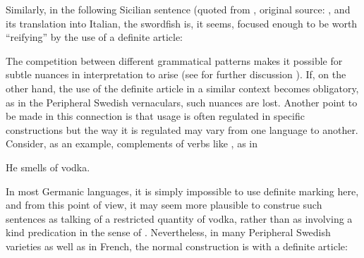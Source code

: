 Similarly, in the following Sicilian sentence (quoted from \citet[413]{BertinettoEtAl2000}, original source: \citet[231]{Skubic1973-74}, and its translation into Italian, the swordfish is, it seems, focused enough to be worth “reifying” by the use of a definite article:

\ea 
	\z	 
\z

The competition between different grammatical patterns makes it possible for subtle nuances in interpretation to arise (see for further discussion \citet[128-134]{Dahl2004}). If, on the other hand, the use of the definite article in a similar context becomes obligatory, as in the Peripheral Swedish vernaculars, such nuances are lost. Another point to be made in this connection is that usage is often regulated in specific constructions but the way it is regulated may vary from one language to another. Consider, as an example, complements of verbs like , as in

\ea
\gl He smells of vodka.  
 \z


In most Germanic languages, it is simply impossible to use definite marking here, and from this point of view, it may seem more plausible to construe such sentences as talking of a restricted quantity of vodka, rather than as involving a kind predication in the sense of \citet{KrifkaEtAl1995}. Nevertheless, in many Peripheral Swedish varieties as well as in French, the normal construction is with a definite article: 

